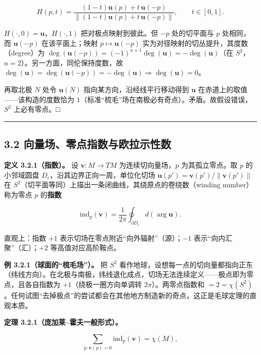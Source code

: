 \[
H(p,t)=\frac{(1-t)\mathbf{u}(p)+t\,\mathbf{u}(-p)}{\|(1-t)\mathbf{u}(p)+t\,\mathbf{u}(-p)\|},\qquad t\in[0,1].
\]

\(H(\cdot,0)=\mathbf{u}\)，\(H(\cdot,1)\) 把对极点映射到彼此。但 \(-p\)
处的切平面与 \(p\) 处相同，而 \(\mathbf{u}(-p)\) 在该平面上；映射
\(p\mapsto \mathbf{u}(-p)\) 实为对径映射的切丛提升，其度数（degree）为
\(\deg(\mathbf{u}(-p)) = (-1)^{n+1}\deg(\mathbf{u}) = -\deg(\mathbf{u})\)（在
\(S^2\)，\(n=2\)）。另一方面，同伦保持度数，故
\(\deg(\mathbf{u})=\deg(\mathbf{u}(-p))=-\deg(\mathbf{u})\Rightarrow \deg(\mathbf{u})=0\)。

再取北极 \(N\) 处令 \(\mathbf{u}(N)\) 指向某方向，沿经线平行移动得到
\(\mathbf{u}\) 在赤道上的取值------该构造的度数恰为
\(1\)（标准``梳毛''场在南极必有奇点）。矛盾。故假设错误，\(S^2\)
上必有零点。□

\begin{center}\rule{0.5\linewidth}{0.5pt}\end{center}

\subsection{3.2
向量场、零点指数与欧拉示性数}\label{ux5411ux91cfux573aux96f6ux70b9ux6307ux6570ux4e0eux6b27ux62c9ux793aux6027ux6570}

\textbf{定义 3.2.1（指数）。} 设 \(\mathbf{v}:M\to TM\)
为连续切向量场，\(p\) 为其孤立零点。取 \(p\) 的小邻域圆盘
\(D_\epsilon\)，沿其边界正向一周，单位化切场
\(\mathbf{u}(p')=\mathbf{v}(p')/\|\mathbf{v}(p')\|\) 在
\(S^2\)（切平面等同）上描出一条闭曲线，其绕原点的卷绕数（winding
number）称为零点 \(p\) 的\textbf{指数}

\[
\mathrm{ind}_p(\mathbf{v})=\frac{1}{2\pi}\oint_{\partial D_\epsilon} d\!\left(\arg \mathbf{u}\right).
\]

直观上：指数 \(+1\) 表示切场在零点附近``向外辐射''（源）；\(-1\)
表示``向内汇聚''（汇）；\(+2\) 等高值对应高阶鞍点。

\textbf{例 3.2.1（球面的``梳毛场''）。} 把 \(S^2\)
看作地球，设想每一点的切向量都指向正东（纬线方向）。在北极与南极，纬线退化成点，切场无法连续定义------极点即为零点，且各自指数为
\(+1\)（绕极一圈方向单调转 \(2\pi\)）。两零点指数和
\(=2=\chi(S^2)\)。任何试图``去掉极点''的尝试都会在其他地方制造新的奇点，这正是毛球定理的直观本质。

\textbf{定理 3.2.1（庞加莱--霍夫一般形式）。}

\[
\sum_{p:\mathbf{v}(p)=0}\mathrm{ind}_p(\mathbf{v})=\chi(M),
\]

